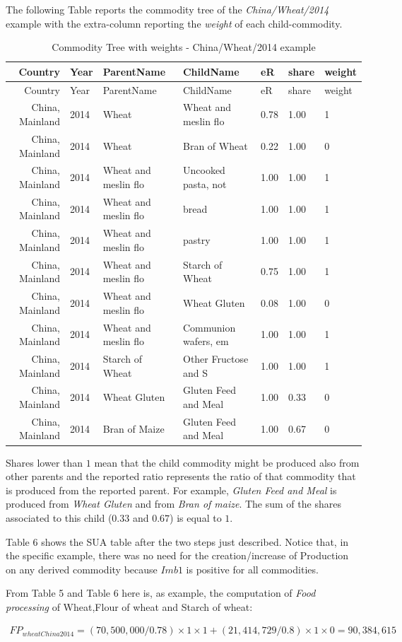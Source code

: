 \documentclass[]{article}
\begin{document}
The following Table reports the commodity tree of the
\emph{China/Wheat/2014} example with the extra-column reporting the
\emph{weight} of each child-commodity.

\begin{longtable}[]{@{}rllllll@{}}
\caption{Commodity Tree with weights - China/Wheat/2014
example}\tabularnewline
\toprule
Country & Year & ParentName & ChildName & eR & share &
weight\tabularnewline
\midrule
\endfirsthead
\toprule
Country & Year & ParentName & ChildName & eR & share &
weight\tabularnewline
\midrule
\endhead
China, Mainland & 2014 & Wheat & Wheat and meslin flo & 0.78 & 1.00 &
1\tabularnewline
China, Mainland & 2014 & Wheat & Bran of Wheat & 0.22 & 1.00 &
0\tabularnewline
China, Mainland & 2014 & Wheat and meslin flo & Uncooked pasta, not &
1.00 & 1.00 & 1\tabularnewline
China, Mainland & 2014 & Wheat and meslin flo & bread & 1.00 & 1.00 &
1\tabularnewline
China, Mainland & 2014 & Wheat and meslin flo & pastry & 1.00 & 1.00 &
1\tabularnewline
China, Mainland & 2014 & Wheat and meslin flo & Starch of Wheat & 0.75 &
1.00 & 1\tabularnewline
China, Mainland & 2014 & Wheat and meslin flo & Wheat Gluten & 0.08 &
1.00 & 0\tabularnewline
China, Mainland & 2014 & Wheat and meslin flo & Communion wafers, em &
1.00 & 1.00 & 1\tabularnewline
China, Mainland & 2014 & Starch of Wheat & Other Fructose and S & 1.00 &
1.00 & 1\tabularnewline
China, Mainland & 2014 & Wheat Gluten & Gluten Feed and Meal & 1.00 &
0.33 & 0\tabularnewline
China, Mainland & 2014 & Bran of Maize & Gluten Feed and Meal & 1.00 &
0.67 & 0\tabularnewline
\bottomrule
\end{longtable}

Shares lower than \(1\) mean that the child commodity might be produced
also from other parents and the reported ratio represents the ratio of
that commodity that is produced from the reported parent. For example,
\emph{Gluten Feed and Meal} is produced from \emph{Wheat Gluten} and
from \emph{Bran of maize}. The sum of the shares associated to this
child (\(0.33\) and \(0.67\)) is equal to \(1\).

Table 6 shows the SUA table after the two steps just described. Notice
that, in the specific example, there was no need for the
creation/increase of Production on any derived commodity because
\(Imb1\) is positive for all commodities.

From Table 5 and Table 6 here is, as example, the computation of
\emph{Food processing} of Wheat,Flour of wheat and Starch of wheat:

\begin{equation}
\begin{multlined}
\label{eq:wheatFP}
FP_{wheatChina2014} = \left(70,500,000/0.78\right)\times 1\times 1 +\left(21,414,729/0.8\right)\times 1\times 0 = 90,384,615
\end{multlined}
\end{equation}
\end{document}
